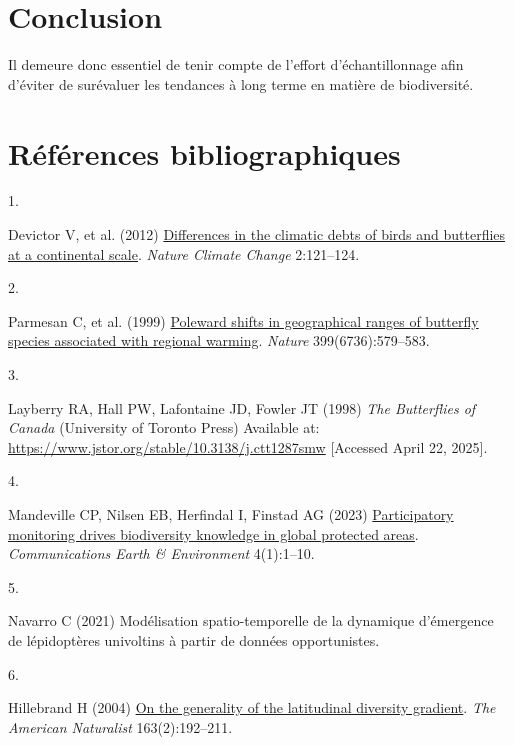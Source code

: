 \documentclass[9pt,twocolumn,twoside,]{pnas-new}
\newlength{\cslhangindent}
\newlength{\csllabelwidth}
\newenvironment{CSLReferences}[2] %
 {\begin{list}{}{%
  \setlength{\itemindent}{0pt}
  \setlength{\leftmargin}{0pt}
  \setlength{\parsep}{0pt}
  \ifodd #1
   \setlength{\leftmargin}{\cslhangindent}
   \setlength{\itemindent}{-1\cslhangindent}
  \fi
  \setlength{\itemsep}{#2\baselineskip}}}
 {\end{list}}
\newcommand{\CSLLeftMargin}[1]{\parbox[t]{\csllabelwidth}{#1}}
\newcommand{\CSLRightInline}[1]{\parbox[t]{\linewidth - \csllabelwidth}{#1}\break}
\begin{document}
\section{Conclusion}\label{conclusion}

Il demeure donc essentiel de tenir compte de l'effort d'échantillonnage
afin d'éviter de surévaluer les tendances à long terme en matière de
biodiversité.

\section{Références
bibliographiques}\label{ruxe9fuxe9rences-bibliographiques}

\showmatmethods
\pnasbreak

\label{refs}
\begin{CSLReferences}{0}{1}
\CSLLeftMargin{1. }%
\CSLRightInline{Devictor V, et al. (2012)
\href{https://doi.org/10.1038/NCLIMATE1347}{Differences in the climatic
debts of birds and butterflies at a continental scale}. \emph{Nature
Climate Change} 2:121--124.}

\CSLLeftMargin{2. }%
\CSLRightInline{Parmesan C, et al. (1999)
\href{https://doi.org/10.1038/21181}{Poleward shifts in geographical
ranges of butterfly species associated with regional warming}.
\emph{Nature} 399(6736):579--583.}

\CSLLeftMargin{3. }%
\CSLRightInline{Layberry RA, Hall PW, Lafontaine JD, Fowler JT (1998)
\emph{The {Butterflies} of {Canada}} (University of Toronto Press)
Available at: \url{https://www.jstor.org/stable/10.3138/j.ctt1287smw}
{[}Accessed April 22, 2025{]}.}

\CSLLeftMargin{4. }%
\CSLRightInline{Mandeville CP, Nilsen EB, Herfindal I, Finstad AG (2023)
\href{https://doi.org/10.1038/s43247-023-00906-2}{Participatory
monitoring drives biodiversity knowledge in global protected areas}.
\emph{Communications Earth \& Environment} 4(1):1--10.}

\CSLLeftMargin{5. }%
\CSLRightInline{Navarro C (2021) Modélisation spatio-temporelle de la
dynamique d'émergence de lépidoptères univoltins à partir de données
opportunistes.}

\CSLLeftMargin{6. }%
\CSLRightInline{Hillebrand H (2004)
\href{https://doi.org/10.1086/381004}{On the generality of the
latitudinal diversity gradient}. \emph{The American Naturalist}
163(2):192--211.}

\end{CSLReferences}



% 
\end{document}
